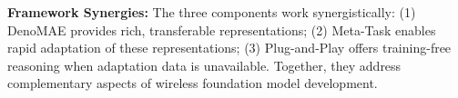 \textbf{Framework Synergies:} The three components work synergistically: (1) DenoMAE provides rich, transferable representations; (2) Meta-Task enables rapid adaptation of these representations; (3) Plug-and-Play offers training-free reasoning when adaptation data is unavailable. Together, they address complementary aspects of wireless foundation model development.







